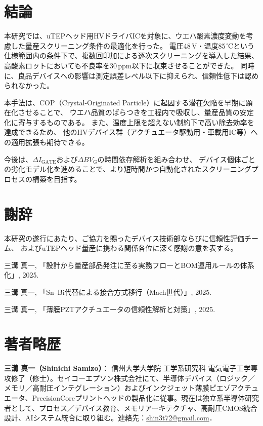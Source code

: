 \documentclass[twocolumn]{ieeetran}
\begin{document}
\section{結論}
本研究では、uTEPヘッド用HVドライバICを対象に、ウエハ酸素濃度変動を考慮した量産スクリーニング条件の最適化を行った。
電圧48\,V・温度85\,℃という仕様範囲内の条件下で、複数回印加による逐次スクリーニングを導入した結果、
高酸素ロットにおいても不良率を30\,ppm以下に収束させることができた。
同時に、良品デバイスへの影響は測定誤差レベル以下に抑えられ、信頼性低下は認められなかった。

本手法は、COP（Crystal-Originated Particle）に起因する潜在欠陥を早期に顕在化させることで、
ウエハ品質のばらつきを工程内で吸収し、量産品質の安定化に寄与するものである。
また、温度上限を超えない制約下で高い除去効率を達成できるため、
他のHVデバイス群（アクチュエータ駆動用・車載用IC等）への適用拡張も期待できる。

今後は、$\Delta I_\mathrm{GATE}$および$\Delta BV_\mathrm{G}$の時間依存解析を組み合わせ、
デバイス個体ごとの劣化モデル化を進めることで、より短時間かつ自動化されたスクリーニングプロセスの構築を目指す。

\section*{謝辞}
本研究の遂行にあたり、ご協力を賜ったデバイス技術部ならびに信頼性評価チーム、
およびuTEPヘッド量産に携わる関係各位に深く感謝の意を表する。

\begin{thebibliography}{99}

三溝 真一, 「設計から量産部品発注に至る実務フローとBOM運用ルールの体系化」, 2025.

三溝 真一, 「Sn–Bi代替による接合方式移行（Mach世代）」, 2025.

三溝 真一, 「薄膜PZTアクチュエータの信頼性解析と対策」, 2025.

\end{thebibliography}

\section*{著者略歴}
\noindent\textbf{三溝 真一（Shinichi Samizo）}：
信州大学大学院 工学系研究科 電気電子工学専攻修了（修士）。セイコーエプソン株式会社にて、半導体デバイス（ロジック／メモリ／高耐圧インテグレーション）およびインクジェット薄膜ピエゾアクチュエータ、PrecisionCoreプリントヘッドの製品化に従事。現在は独立系半導体研究者として、プロセス／デバイス教育、メモリアーキテクチャ、高耐圧CMOS統合設計、AIシステム統合に取り組む。連絡先：\href{mailto:shin3t72@gmail.com}{shin3t72@gmail.com}．
\end{document}
